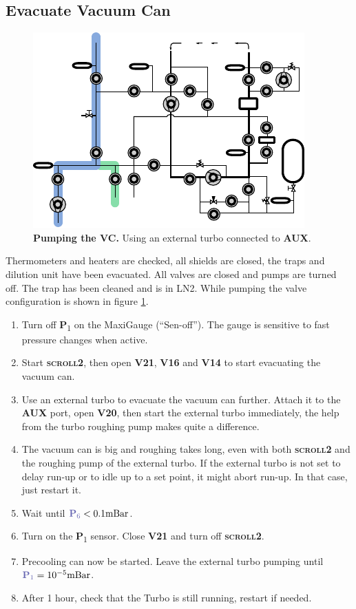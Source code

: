 \documentclass{article}[18pt,A4]
\newcommand{\mBar}{\mathrm{mBar}}
\newcommand{\thing}[1]{{\color{gray}\textsc{ \textbf{#1}}}}
\newcommand{\valve}[1]{{\color{gray}\textbf{V#1}}}
\newcommand{\pressure}[1]{{\color{pressurecolor}\textbf{P}\textsubscript{#1}}}
\begin{document}
\newpage
\subsection{Evacuate Vacuum Can}

\begin{figure}[ht]
\centering
\includegraphics{fig/blu_fors_ghs_pump_vc.pdf}
\caption{\textbf{Pumping the VC.} Using an external turbo connected to \thing{AUX}. 
\label{fig:blu_fors_ghs_pump_vc}
}
\end{figure}

Thermometers and heaters are checked, all shields are closed, the traps and dilution unit have been evacuated.
All valves are closed and pumps are turned off.
The trap has been cleaned and is in LN2.
While pumping the valve configuration is shown in figure  \ref{fig:blu_fors_ghs_pump_vc}.
\begin{enumerate}
    \item Turn off \pressure{1} on the MaxiGauge (``Sen-off'').
    The gauge is sensitive to fast pressure changes when active.
    \item Start \thing{scroll2}, then open \valve{21}, \valve{16} and \valve{14} to start evacuating the vacuum can. 
    \item Use an external turbo to evacuate the vacuum can further.
    Attach it to the \thing{AUX} port, open \valve{20}, then start the external turbo immediately, the help from the turbo roughing pump makes quite a difference.
    \item The vacuum can is big and roughing takes long, even with both \thing{scroll2} and the roughing pump of the external turbo.
    If the external turbo is not set to delay run-up or to idle up to a set point, it might abort run-up. In that case, just restart it.
    \item Wait until $\pressure{6} < 0.1 \mBar$.
    \item Turn on the \pressure{1} sensor. Close \valve{21} and turn off \thing{scroll2}.
    \item Precooling can now be started. Leave the external turbo pumping until $\pressure{1} = 10^{-5} \mBar$. 
    \item After 1 hour, check that the Turbo is still running, restart if needed.
\end{enumerate}
\end{document}
